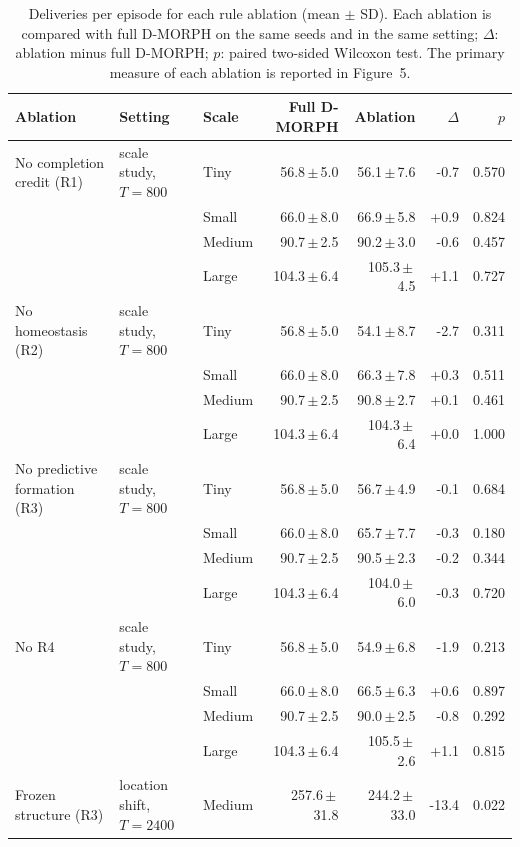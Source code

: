 \begin{table}[htbp]
\centering
\caption{Deliveries per episode for each rule ablation (mean $\pm$ SD). Each ablation is compared with full D-MORPH on the same seeds and in the same setting; $\Delta$: ablation minus full D-MORPH; $p$: paired two-sided Wilcoxon test. The primary measure of each ablation is reported in Figure~5.}
\label{tab:ablation_deliveries}
\footnotesize
\setlength{\tabcolsep}{4pt}
\begin{tabular}{lllrrrr}
\hline
Ablation & Setting & Scale & Full D-MORPH & Ablation & $\Delta$ & $p$ \\
\hline
No completion credit (R1) & scale study, $T=800$ & Tiny & 56.8\,$\pm$\,5.0 & 56.1\,$\pm$\,7.6 & -0.7 & 0.570 \\
 &  & Small & 66.0\,$\pm$\,8.0 & 66.9\,$\pm$\,5.8 & +0.9 & 0.824 \\
 &  & Medium & 90.7\,$\pm$\,2.5 & 90.2\,$\pm$\,3.0 & -0.6 & 0.457 \\
 &  & Large & 104.3\,$\pm$\,6.4 & 105.3\,$\pm$\,4.5 & +1.1 & 0.727 \\
\hline
No homeostasis (R2) & scale study, $T=800$ & Tiny & 56.8\,$\pm$\,5.0 & 54.1\,$\pm$\,8.7 & -2.7 & 0.311 \\
 &  & Small & 66.0\,$\pm$\,8.0 & 66.3\,$\pm$\,7.8 & +0.3 & 0.511 \\
 &  & Medium & 90.7\,$\pm$\,2.5 & 90.8\,$\pm$\,2.7 & +0.1 & 0.461 \\
 &  & Large & 104.3\,$\pm$\,6.4 & 104.3\,$\pm$\,6.4 & +0.0 & 1.000 \\
\hline
No predictive formation (R3) & scale study, $T=800$ & Tiny & 56.8\,$\pm$\,5.0 & 56.7\,$\pm$\,4.9 & -0.1 & 0.684 \\
 &  & Small & 66.0\,$\pm$\,8.0 & 65.7\,$\pm$\,7.7 & -0.3 & 0.180 \\
 &  & Medium & 90.7\,$\pm$\,2.5 & 90.5\,$\pm$\,2.3 & -0.2 & 0.344 \\
 &  & Large & 104.3\,$\pm$\,6.4 & 104.0\,$\pm$\,6.0 & -0.3 & 0.720 \\
\hline
No R4 & scale study, $T=800$ & Tiny & 56.8\,$\pm$\,5.0 & 54.9\,$\pm$\,6.8 & -1.9 & 0.213 \\
 &  & Small & 66.0\,$\pm$\,8.0 & 66.5\,$\pm$\,6.3 & +0.6 & 0.897 \\
 &  & Medium & 90.7\,$\pm$\,2.5 & 90.0\,$\pm$\,2.5 & -0.8 & 0.292 \\
 &  & Large & 104.3\,$\pm$\,6.4 & 105.5\,$\pm$\,2.6 & +1.1 & 0.815 \\
\hline
Frozen structure (R3) & location shift, $T=2400$ & Medium & 257.6\,$\pm$\,31.8 & 244.2\,$\pm$\,33.0 & -13.4 & 0.022 \\

\end{tabular}
\end{table}
